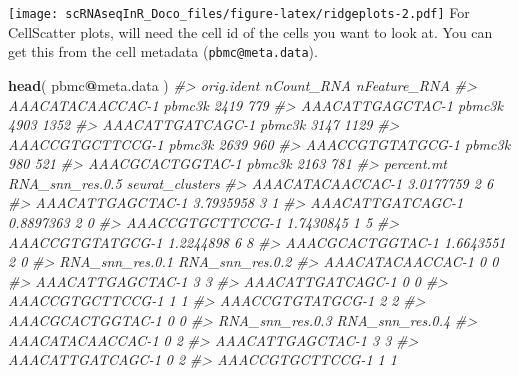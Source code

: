 \documentclass[
]{book}
\newenvironment{Shaded}{\begin{snugshade}}{\end{snugshade}}
\newcommand{\CommentTok}[1]{\textcolor[rgb]{0.56,0.35,0.01}{\textit{#1}}}
\newcommand{\FunctionTok}[1]{\textcolor[rgb]{0.13,0.29,0.53}{\textbf{#1}}}
\newcommand{\NormalTok}[1]{#1}
\newcommand{\SpecialCharTok}[1]{\textcolor[rgb]{0.81,0.36,0.00}{\textbf{#1}}}
\begin{document}
\texttt{[image: scRNAseqInR\_Doco\_files/figure-latex/ridgeplots-2.pdf]}
For CellScatter plots, will need the cell id of the cells you want to look at. You can get this from the cell metadata (\texttt{pbmc@meta.data}).

\begin{Shaded}
\begin{Highlighting}[]
\FunctionTok{head}\NormalTok{( pbmc}\SpecialCharTok{@}\NormalTok{meta.data )}
\CommentTok{\#\textgreater{}                  orig.ident nCount\_RNA nFeature\_RNA}
\CommentTok{\#\textgreater{} AAACATACAACCAC{-}1     pbmc3k       2419          779}
\CommentTok{\#\textgreater{} AAACATTGAGCTAC{-}1     pbmc3k       4903         1352}
\CommentTok{\#\textgreater{} AAACATTGATCAGC{-}1     pbmc3k       3147         1129}
\CommentTok{\#\textgreater{} AAACCGTGCTTCCG{-}1     pbmc3k       2639          960}
\CommentTok{\#\textgreater{} AAACCGTGTATGCG{-}1     pbmc3k        980          521}
\CommentTok{\#\textgreater{} AAACGCACTGGTAC{-}1     pbmc3k       2163          781}
\CommentTok{\#\textgreater{}                  percent.mt RNA\_snn\_res.0.5 seurat\_clusters}
\CommentTok{\#\textgreater{} AAACATACAACCAC{-}1  3.0177759               2               6}
\CommentTok{\#\textgreater{} AAACATTGAGCTAC{-}1  3.7935958               3               1}
\CommentTok{\#\textgreater{} AAACATTGATCAGC{-}1  0.8897363               2               0}
\CommentTok{\#\textgreater{} AAACCGTGCTTCCG{-}1  1.7430845               1               5}
\CommentTok{\#\textgreater{} AAACCGTGTATGCG{-}1  1.2244898               6               8}
\CommentTok{\#\textgreater{} AAACGCACTGGTAC{-}1  1.6643551               2               0}
\CommentTok{\#\textgreater{}                  RNA\_snn\_res.0.1 RNA\_snn\_res.0.2}
\CommentTok{\#\textgreater{} AAACATACAACCAC{-}1               0               0}
\CommentTok{\#\textgreater{} AAACATTGAGCTAC{-}1               3               3}
\CommentTok{\#\textgreater{} AAACATTGATCAGC{-}1               0               0}
\CommentTok{\#\textgreater{} AAACCGTGCTTCCG{-}1               1               1}
\CommentTok{\#\textgreater{} AAACCGTGTATGCG{-}1               2               2}
\CommentTok{\#\textgreater{} AAACGCACTGGTAC{-}1               0               0}
\CommentTok{\#\textgreater{}                  RNA\_snn\_res.0.3 RNA\_snn\_res.0.4}
\CommentTok{\#\textgreater{} AAACATACAACCAC{-}1               0               2}
\CommentTok{\#\textgreater{} AAACATTGAGCTAC{-}1               3               3}
\CommentTok{\#\textgreater{} AAACATTGATCAGC{-}1               0               2}
\CommentTok{\#\textgreater{} AAACCGTGCTTCCG{-}1               1               1}

\end{Highlighting}
\end{Shaded}
\end{document}
